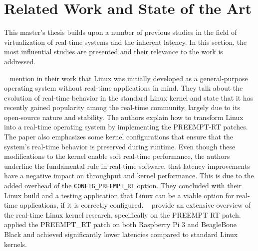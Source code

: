 \documentclass[MMR,Master,english]{style/twbook}
\begin{document}
\section{Related Work and State of the Art}
This master's thesis builds upon a number of previous studies in the field of virtualization of real-time systems and the inherent latency. In this section, the most influential studies are presented and their relevance to the work is addressed.

\bigskip \noindent \citeauthor{perneelRealtimeCapabilitiesStandard2015}~\cite{perneelRealtimeCapabilitiesStandard2015} mention in their work that Linux was initially developed as a general-purpose operating system without real-time applications in mind. They talk about the evolution of real-time behavior in the standard Linux kernel and state that it has recently gained popularity among the real-time community, largely due to its open-source nature and stability. The authors explain how to transform Linux into a real-time operating system by implementing the PREEMPT-RT patches. The paper also emphasizes some kernel configurations that ensure that the system's real-time behavior is preserved during runtime. Even though these modifications to the kernel enable soft real-time performance, the authors underline the fundamental rule in real-time software, that latency improvements have a negative impact on throughput and kernel performance. This is due to the added overhead of the \texttt{CONFIG\_PREEMPT\_RT} option. They concluded with their Linux build and a testing application that Linux can be a viable option for real-time applications, if it is correctly configured. \citeauthor{reghenzaniRealTimeLinuxKernel2020}~\cite{reghenzaniRealTimeLinuxKernel2020} provide an extensive overview of the real-time Linux kernel research, specifically on the PREEMPT RT patch. \citeauthor{adamRealTimePerformanceResponse2021}~\cite{adamRealTimePerformanceResponse2021} applied the PREEMPT\_RT patch on both Raspberry Pi 3 and BeagleBone Black and achieved significantly lower latencies compared to standard Linux kernels.
\end{document}
